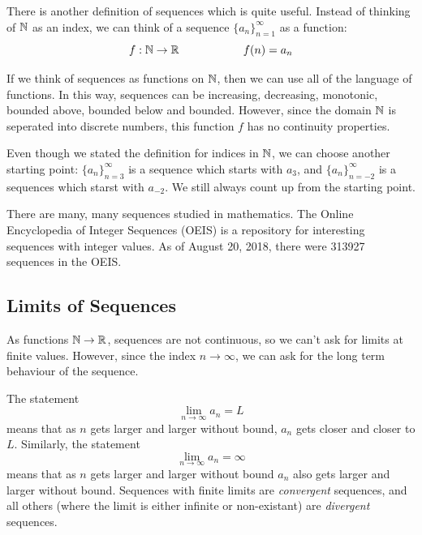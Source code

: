 \documentclass[fleqn,letterpaper]{report}
\begin{document}
\begin{defn}There is another definition of sequences which is
quite useful. Instead of thinking of $\mathbb{N}$ as an index, we can
think of a sequence $\{a_n\}_{n=1}^\infty$ as a function:
\begin{equation*}
f: \mathbb{N} \rightarrow \mathbb{R} \hspace{2cm} f(n) = a_n
\end{equation*}
\end{defn}

If we think of sequences as functions on $\mathbb{N}$, then we can
use all of the language of functions. In this way, sequences
can be increasing, decreasing, monotonic, bounded above,
bounded below and bounded. However, since the domain $\mathbb{N}$ is
seperated into discrete numbers, this function $f$ has no
continuity properties.

Even though we stated the definition for indices in $\mathbb{N}$, we
can choose another starting point: $\{a_n\}_{n=3}^\infty$ is a
sequence which starts with $a_3$, and $\{a_n\}_{n=-2}^\infty$
is a sequences which starst with $a_{-2}$. We still always
count up from the starting point.

There are many, many sequences studied in mathematics. The
Online Encyclopedia of Integer Sequences (OEIS) is a
repository for interesting sequences with integer values. As
of August 20, 2018, there were 313927 sequences in the OEIS.

\subsection{Limits of Sequences}
\label{sequences-limits}

As functions $\mathbb{N} \rightarrow \mathbb{R}$, sequences are not
continuous, so we can't ask for limits at finite values.
However, since the index $n \rightarrow \infty$, we can ask
for the long term behaviour of the sequence. 

\begin{defn}
The statement
\begin{equation*}
\lim_{n \rightarrow \infty} a_n = L
\end{equation*}
means that as $n$ gets larger and larger without bound, $a_n$
gets closer and closer to $L$. Similarly, the statement 
\begin{equation*}
\lim_{n \rightarrow \infty} a_n = \infty
\end{equation*}
means that as $n$ gets larger and larger without bound $a_n$
also gets larger and larger without bound. 
Sequences with finite limits are \emph{convergent} sequences,
and all others (where the limit is either infinite or
non-existant) are \emph{divergent} sequences.
\end{defn}
\end{document}
